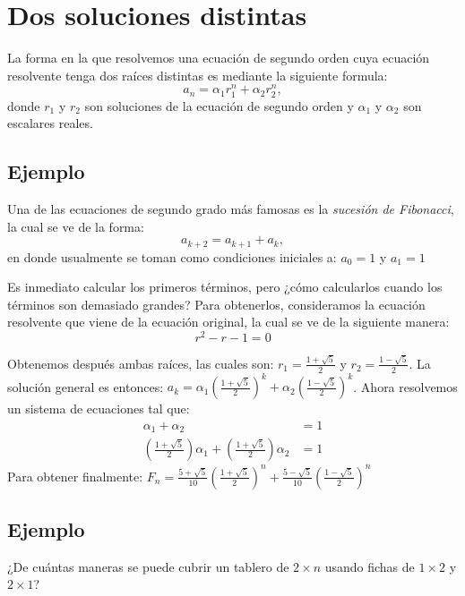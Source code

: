 \documentclass{report}
\begin{document}
\section{Dos soluciones distintas}
\label{sec:distintas}
La forma en la que resolvemos una ecuación de segundo orden cuya
ecuación resolvente tenga dos raíces distintas es mediante la
siguiente formula:
\begin{equation}
 \label{raicesdistintas}
 a_n=\alpha_1r_1^n +\alpha_2r_2^n,
\end{equation}
donde $r_1$ y $r_2$ son soluciones de la ecuación de segundo orden y
$\alpha_1$ y $\alpha_2$ son escalares reales.
\subsection{Ejemplo}

Una de las ecuaciones de segundo grado más famosas es la \textit{sucesión de
  Fibonacci}, la cual se ve de la forma:
\begin{equation}
  \label{eq:fibonacci}
a_{k+2}=a_{k+1}+a_{k},  
\end{equation}
en donde usualmente se toman como condiciones iniciales a: $a_{0}=1$ y $a_{1}=1$

Es inmediato calcular los primeros términos, pero ¿cómo calcularlos
cuando los términos son demasiado grandes?  Para obtenerlos,
consideramos la ecuación resolvente que viene de la ecuación original,
la cual se ve de la siguiente manera:
$$r^2-r-1=0$$

Obtenemos después ambas raíces, las cuales son:
$r_{1}= \frac{1+\sqrt{5}}{2}$ y $r_{2}=\frac{1-\sqrt{5}}{2}$. La
solución general es entonces:
$a_{k}=\alpha_{1}(\frac{1+\sqrt{5}}{2})^{k} +
\alpha_{2}(\frac{1-\sqrt{5}}{2})^k$.
Ahora resolvemos un sistema de ecuaciones tal que:
\begin{align*}
\alpha_{1} + \alpha_{2} &= 1\\
(\frac{1+\sqrt{5}}{2})\alpha_{1} + (\frac{1+\sqrt{5}}{2})\alpha_{2}&=1
\end{align*}
Para obtener finalmente:
$F_{n}= \frac{5+\sqrt{5}}{10}(\frac{1+\sqrt{5}}{2})^n +
\frac{5-\sqrt{5}}{10}(\frac{1-\sqrt{5}}{2})^n$

\subsection{Ejemplo}
\label{sec:fichas}

¿De cuántas maneras se puede cubrir un tablero de $2\times n$ usando
fichas de $1\times 2$ y $2\times 1$?
\end{document}
